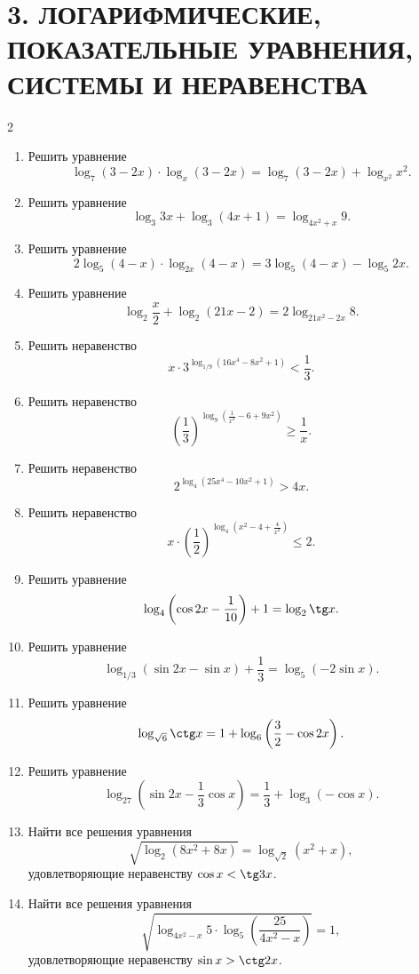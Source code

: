 \documentclass[14pt,a4paper,landscape]{article}
\begin{document}
\fontsize{10}{8pt}\selectfont

\section*{3. ЛОГАРИФМИЧЕСКИЕ, ПОКАЗАТЕЛЬНЫЕ УРАВНЕНИЯ, СИСТЕМЫ И НЕРАВЕНСТВА}

\setlength{\columnsep}{2cm}
\setlength{\columnseprule}{0.4pt}

\begin{multicols}{2}

\begin{enumerate}[label=3.\arabic*, leftmargin=1.5em]
    \item Решить уравнение $$\log_7(3-2x) \cdot \log_{x}(3-2x) = \log_7(3-2x) + \log_{x^2} x^2.$$
    \item Решить уравнение $$\log_3 3x + \log_3(4x+1) = \log_{4x^2+x} 9.$$
    \item Решить уравнение $$2\log_5(4-x) \cdot \log_{2x}(4-x) = 3\log_5(4-x) - \log_5 2x.$$
    \item Решить уравнение $$\log_2 \frac{x}{2} + \log_2(21x-2) = 2\log_{21x^2-2x} 8.$$
    \item Решить неравенство $$x \cdot 3^{\log_{1/9}(16x^4-8x^2+1)} < \frac{1}{3}.$$
    \item Решить неравенство $$\left(\frac{1}{3}\right)^{\log_9\left(\frac{1}{x^2}-6+9x^2\right)} \geqslant \frac{1}{x}.$$
    \item Решить неравенство $$2^{\log_4(25x^4-10x^2+1)} > 4x.$$
    \item Решить неравенство $$x \cdot \left(\frac{1}{2}\right)^{\log_4\left(x^2-4+\frac{4}{x^2}\right)} \leqslant 2.$$
    \item Решить уравнение $$\log_4\left(\cos 2x - \frac{1}{10}\right) + 1 = \log_2 \tg x.$$
    \item Решить уравнение $$\log_{1/3}(\sin 2x - \sin x) + \frac{1}{3} = \log_5(-2\sin x).$$
    \item Решить уравнение $$\log_{\sqrt{6}} \ctg x = 1 + \log_6\left(\frac{3}{2} - \cos 2x\right).$$
    \item Решить уравнение $$\log_{27}\left(\sin 2x - \frac{1}{3}\cos x\right) = \frac{1}{3} + \log_3(-\cos x).$$
    \item Найти все решения уравнения $$\sqrt{\log_2(8x^2+8x)} = \log_{\sqrt{2}}(x^2+x),$$ удовлетворяющие неравенству $\cos x < \tg 3x$.
    \item Найти все решения уравнения $$\sqrt{\log_{4x^2-x} 5 \cdot \log_5\left(\frac{25}{4x^2-x}\right)} = 1,$$ удовлетворяющие неравенству $\sin x > \ctg 2x$.

\end{enumerate}
\end{multicols}
\end{document}
